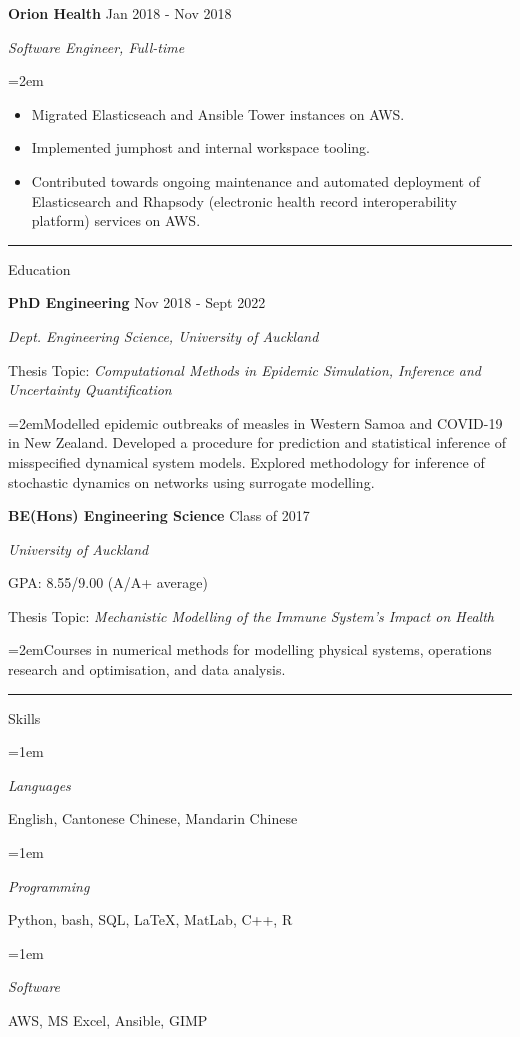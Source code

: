 \documentclass[paper=a4paper,fontsize=11pt]{scrartcl}
\newcommand{\pagerule}[1][2pt]{\noindent\rule{\textwidth}{#1}}
\newcommand{\usingfont}[2]{#1 #2 \par \normalsize \normalfont}
\newcommand{\sectionheader}[1]{\pagerule \vspace{0.05ex} \usingfont{\usefont{T1}{phv}{m}{v} \Large}{\noindent \hspace{-0.5em} #1} \vspace{0.5ex}}
\newlength{\spacebox}
\newcommand{\indented}[1][2em]{\noindent\hangindent=#1\hangafter=0}
\begin{document}
\normalsize \par\par
\noindent \textbf{Orion Health} \hfill
{Jan 2018 - Nov 2018} \par
\noindent \textit{Software Engineer, Full-time} \par
\indented \small {
    \begin{itemize}
    \setlength{\itemsep}{0ex}
        \item Migrated Elasticseach and Ansible Tower instances on AWS.
        \item Implemented jumphost and internal workspace tooling.
        \item Contributed towards ongoing maintenance and automated
deployment of Elasticsearch and Rhapsody (electronic health record
interoperability platform) services on AWS.
        \end{itemize}
}
\normalsize \par\par

\sectionheader{Education}
\noindent \textbf{PhD Engineering} \hfill
Nov 2018 - Sept 2022 \par
\noindent \textit{Dept. Engineering Science, University of
Auckland} \par
\small Thesis Topic: \emph{Computational Methods in Epidemic Simulation,
Inference and Uncertainty Quantification} \par
\indented \small Modelled epidemic outbreaks of measles in Western Samoa
and COVID-19 in New Zealand. Developed a procedure for prediction and
statistical inference of misspecified dynamical system models. Explored
methodology for inference of stochastic dynamics on networks using
surrogate modelling.
\normalsize \par\par
\noindent \textbf{BE(Hons) Engineering Science} \hfill
Class of 2017 \par
\noindent \textit{University of Auckland} \par
\small GPA: 8.55/9.00 (A/A+ average) \par
\small Thesis Topic: \emph{Mechanistic Modelling of the Immune System's
Impact on Health} \par
\indented \small Courses in numerical methods for modelling physical
systems, operations research and optimisation, and data analysis.
\normalsize \par\par

\sectionheader{Skills}
\indented[1em] \parbox{\spacebox}{\textit{Languages}} 
\hspace{1.5em} English, Cantonese Chinese, Mandarin Chinese
\par
\indented[1em] \parbox{\spacebox}{\textit{Programming}} 
\hspace{1.5em} Python, bash, SQL, \LaTeX, MatLab, C++, R
\par
\indented[1em] \parbox{\spacebox}{\textit{Software}} 
\hspace{1.5em} AWS, MS Excel, Ansible, GIMP
\par
\end{document}
